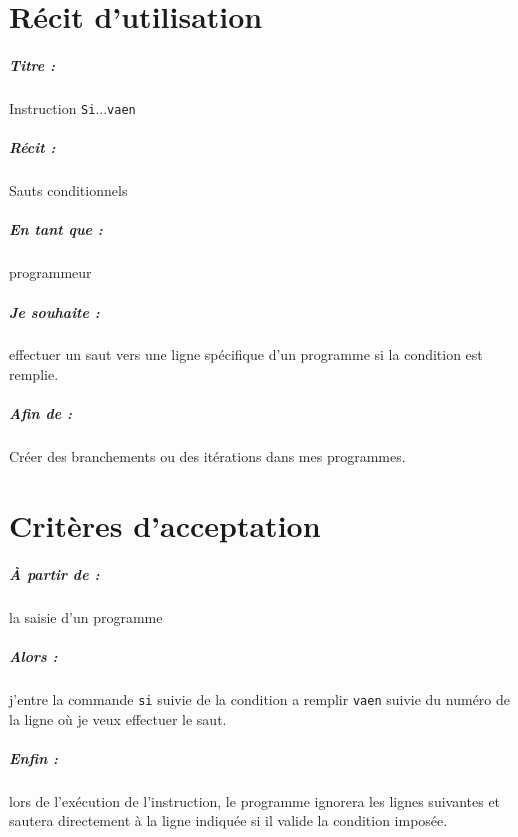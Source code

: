 \documentclass[12pt,a5paper, notitle, oneside]{report}
\begin{document}
	
	\chapter*{Récit d'utilisation}
	
	\paragraph{Titre : } Instruction \verb|Si|...\verb|vaen|
	\paragraph{Récit : } Sauts conditionnels
	\paragraph{En tant que : } programmeur
	\paragraph{Je souhaite : } effectuer un saut vers une ligne
	spécifique d'un programme si la condition est remplie.
	\paragraph{Afin de : } Créer des branchements ou des itérations
	dans mes programmes.
	\newpage
	
	\chapter*{Critères d'acceptation}
	
	\paragraph{À partir de : } la saisie d'un programme
	\paragraph{Alors : } j'entre la commande \verb|si| suivie de la condition a remplir \verb|vaen| suivie du numéro
	de la ligne où je veux effectuer le saut.
	\paragraph{Enfin : } lors de l'exécution de l'instruction, le programme
	ignorera les lignes suivantes et sautera directement à la ligne
	indiquée si il valide la condition imposée.
	
\end{document}
